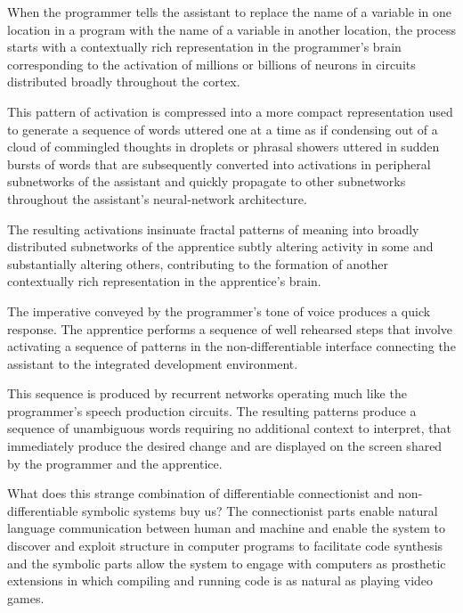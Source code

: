 
When the programmer tells the assistant to replace the name of a variable in one location in a program with the name of a variable in another location, the process starts with a contextually rich representation in the programmer’s brain corresponding to the activation of millions or billions of neurons in circuits distributed broadly throughout the cortex. 

This pattern of activation is compressed into a more compact representation used to generate a sequence of words uttered one at a time as if condensing out of a cloud of commingled thoughts in droplets or phrasal showers uttered in sudden bursts of words that are subsequently converted into activations in peripheral subnetworks of the assistant and quickly propagate to other subnetworks throughout the assistant’s neural-network architecture. 

The resulting activations insinuate fractal patterns of meaning into broadly distributed subnetworks of the apprentice subtly altering activity in some and substantially altering others, contributing to the formation of another contextually rich representation in the apprentice’s brain. 

The imperative conveyed by the programmer’s tone of voice produces a quick response. The apprentice performs a sequence of well rehearsed steps that involve activating a sequence of patterns in the non-differentiable interface connecting the assistant to the integrated development environment. 

This sequence is produced by recurrent networks operating much like the programmer’s speech production circuits. The resulting patterns produce a sequence of unambiguous words \emdash{} requiring no additional context to interpret, that immediately produce the desired change and are displayed on the screen shared by the programmer and the apprentice.

What does this strange combination of differentiable connectionist and non-differentiable symbolic systems buy us? The connectionist parts enable natural language communication between human and machine and enable the system to discover and exploit structure in computer programs to facilitate code synthesis and the symbolic parts allow the system to engage with computers as prosthetic extensions in which compiling and running code is as natural as playing video games.

